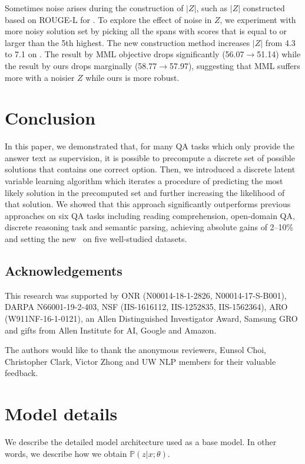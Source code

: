 \documentclass[11pt,a4paper]{article}
\begin{document}
Sometimes noise arises during the construction of $|Z|$, such as $|Z|$ constructed based on ROUGE-L for \narrative. 
To explore the effect of noise in $Z$, we experiment with more noisy solution set by picking all the spans with scores that is equal to or larger than the 5th highest. The new construction method increases $|Z|$ from 4.3 to 7.1 on \narrative.
The result by MML objective drops significantly (56.07$\rightarrow{}$51.14) while the result by ours drops marginally (58.77$\rightarrow{}$57.97), suggesting that MML suffers more with a noisier $Z$ while ours is more robust.
 \section{Conclusion}\label{sec:concl}In this paper, we demonstrated that, for many QA tasks which only provide the answer text as supervision, it is possible to precompute a discrete set of possible solutions that contains one correct option.
Then, we introduced a discrete latent variable learning algorithm which iterates a procedure of predicting the most likely solution in the precomputed set and further increasing the likelihood of that solution.
We showed that this approach significantly outperforms previous approaches on six QA tasks including reading comprehension, open-domain QA, discrete reasoning task and semantic parsing, achieving absolute gains of 2--10\% and setting the new \sota\ on five well-studied datasets.
 
\subsection*{Acknowledgements}
This research was supported by ONR (N00014-18-1-2826, N00014-17-S-B001), DARPA N66001-19-2-403, NSF (IIS-1616112, IIS-1252835, IIS-1562364), ARO (W911NF-16-1-0121), an Allen Distinguished Investigator Award, Samsung GRO and gifts from Allen Institute for AI, Google and Amazon. 

The authors would like to thank the anonymous reviewers, Eunsol Choi, Christopher Clark, Victor Zhong and UW NLP members for their valuable feedback.




\clearpage
\appendix
\section{Model details}\label{app:model-details}We describe the detailed model architecture used as a base model. In other words, we describe how we obtain $\mathbb{P}(z|x; \theta)$.
\end{document}
